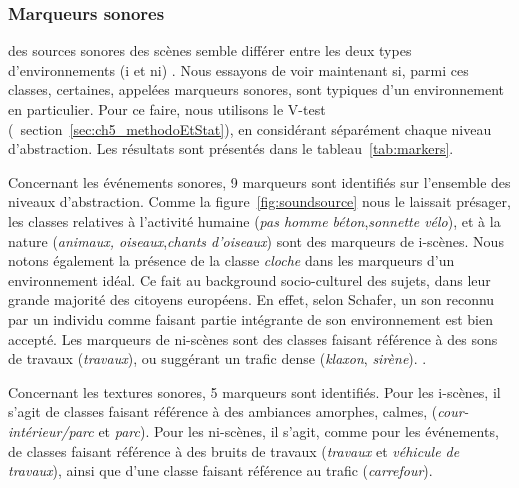 \subsubsection{Marqueurs sonores}

  des sources sonores des scènes semble différer entre les deux types d'environnements (i et ni) . Nous essayons de voir maintenant si, parmi ces classes, certaines, appelées marqueurs sonores, sont typiques d'un environnement en particulier. Pour ce faire, nous utilisons le V-test (\cf~section~\ref{sec:ch5_methodoEtStat}), en considérant séparément chaque niveau d'abstraction. Les résultats sont présentés dans le tableau~\ref{tab:markers}.

Concernant les événements sonores, 9 marqueurs sont identifiés sur l'ensemble des niveaux d'abstraction. Comme la figure~\ref{fig:soundsource} nous le laissait présager, les classes relatives à l'activité humaine (\emph{pas homme béton},\emph{sonnette vélo}), et à la nature (\emph{animaux, oiseaux},\emph{chants d'oiseaux}) sont des marqueurs de i-scènes. Nous notons également la présence de la classe \emph{cloche} dans les marqueurs d'un environnement idéal. Ce fait   au background socio-culturel des sujets, dans leur grande majorité des citoyens européens. En effet, selon Schafer, un son reconnu par un individu comme faisant partie intégrante de son environnement est bien accepté. Les marqueurs de ni-scènes sont des classes faisant référence à des sons de travaux (\emph{travaux}), ou suggérant un trafic dense (\emph{klaxon}, \emph{sirène}). .

Concernant les textures sonores, 5 marqueurs sont identifiés. Pour les i-scènes, il s'agit de classes faisant référence à des ambiances amorphes, calmes, (\emph{cour-intérieur/parc} et \emph{parc}). Pour les ni-scènes, il s'agit, comme pour les événements, de classes faisant référence à des bruits de travaux (\emph{travaux} et \emph{véhicule de travaux}), ainsi que d'une classe faisant référence au trafic (\emph{carrefour}).


